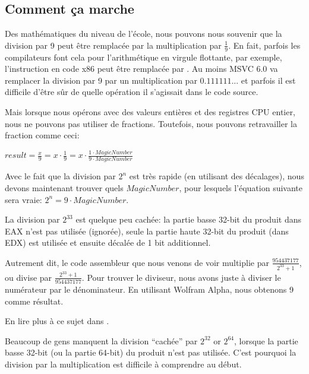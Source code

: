 ﻿\subsection{Comment ça marche}

Des mathématiques du niveau de l'école, nous pouvons nous souvenir que la division
par 9 peut être remplacée par la multiplication par $\frac{1}{9}$.
En fait, parfois les compilateurs font cela pour l'arithmétique en virgule flottante,
par exemple, l'instruction  en code x86 peut être remplacée par .
Au moins MSVC 6.0 va remplacer la division par 9 par un multiplication par $0.111111...$
et parfois il est difficile d'être sûr de quelle opération il s'agissait dans le
code source.

Mais lorsque nous opérons avec des valeurs entières et des registres CPU entier,
nous ne pouvons pas utiliser de fractions.
Toutefois, nous pouvons retravailler la fraction comme ceci:

\begin{center}
$result = \frac{x}{9} = x \cdot \frac{1}{9} = x \cdot \frac{1 \cdot MagicNumber}{9 \cdot MagicNumber}$
\end{center}

Avec le fait que la division par $2^n$ est très rapide (en utilisant des décalages),
nous devons maintenant trouver quels $MagicNumber$, pour lesquels l'équation suivante
sera vraie: $2^n = 9 \cdot MagicNumber$.

La division par $2^{33}$ est quelque peu cachée: la partie basse 32-bit du produit
dans EAX n'est pas utilisée (ignorée), seule la partie haute 32-bit du produit
(dans EDX) est utilisée et ensuite décalée de 1 bit additionnel.

Autrement dit, le code assembleur que nous venons de voir multiplie par {\Large $\frac{954437177}{{2^{33}+1}}$},
ou divise par {\Large $\frac{{2^{33}+1}}{954437177}$}.
Pour trouver le diviseur, nous avons juste à diviser le numérateur par le dénominateur.
En utilisant Wolfram Alpha, nous obtenons 9 comme résultat.


En lire plus à ce sujet dans .

Beaucoup de gens manquent la division ``cachée'' par $2^{32}$ or $2^{64}$, lorsque
la partie basse 32-bit (ou la partie 64-bit) du produit n'est pas utilisée.
C'est pourquoi la division par la multiplication est difficile à comprendre au début.



